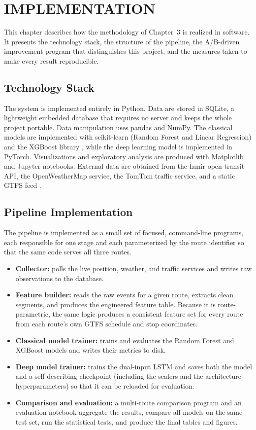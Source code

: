 \chapter{IMPLEMENTATION}

This chapter describes how the methodology of Chapter~3 is realized in software. It presents the technology stack, the structure of the pipeline, the A/B-driven improvement program that distinguishes this project, and the measures taken to make every result reproducible.

\section{Technology Stack}

The system is implemented entirely in Python. Data are stored in SQLite, a lightweight embedded database that requires no server and keeps the whole project portable. Data manipulation uses pandas and NumPy. The classical models are implemented with scikit-learn (Random Forest and Linear Regression) and the XGBoost library \cite{chen2016}, while the deep learning model is implemented in PyTorch. Visualizations and exploratory analysis are produced with Matplotlib and Jupyter notebooks. External data are obtained from the İzmir open transit API, the OpenWeatherMap service, the TomTom traffic service, and a static GTFS feed \cite{gtfs}.

\section{Pipeline Implementation}

The pipeline is implemented as a small set of focused, command-line programs, each responsible for one stage and each parameterized by the route identifier so that the same code serves all three routes.

\begin{itemize}
    \item \textbf{Collector:} polls the live position, weather, and traffic services and writes raw observations to the database.
    \item \textbf{Feature builder:} reads the raw events for a given route, extracts clean segments, and produces the engineered feature table. Because it is route-parametric, the same logic produces a consistent feature set for every route from each route's own GTFS schedule and stop coordinates.
    \item \textbf{Classical model trainer:} trains and evaluates the Random Forest and XGBoost models and writes their metrics to disk.
    \item \textbf{Deep model trainer:} trains the dual-input LSTM and saves both the model and a self-describing checkpoint (including the scalers and the architecture hyperparameters) so that it can be reloaded for evaluation.
    \item \textbf{Comparison and evaluation:} a multi-route comparison program and an evaluation notebook aggregate the results, compare all models on the same test set, run the statistical tests, and produce the final tables and figures.
\end{itemize}

